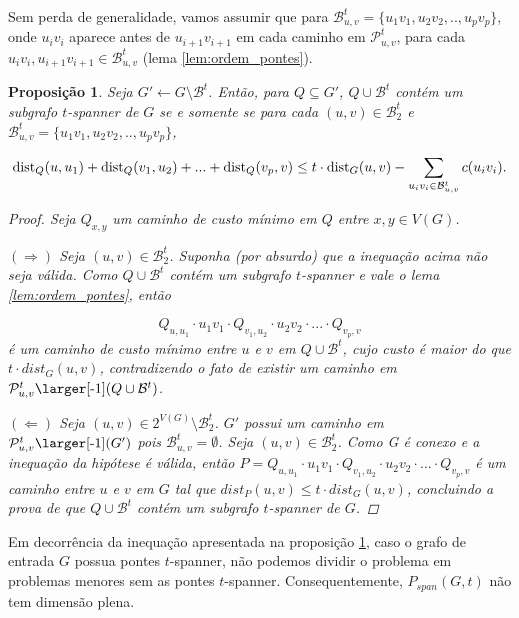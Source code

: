 \documentclass[11pt,reqno]{amsart}
\newcommand{\smallGprime}{\mbox{\larger[-1]$(G')$}}
\newcommand{\spanPath}{\mathcal{P}}
\newcommand{\spanBridge}{\mathcal{B}}
\newcommand{\Pathuv}{\spanPath_{u,v}^{t}}
\newcommand{\PathuvGprime}{\Pathuv\smallGprime}
\newcommand{\Bridgeuv}{\spanBridge_{u,v}^{t}}
\newcommand{\Bridge}{\spanBridge^{t}}
\newcommand{\smallQBridge}{\mbox{\larger[-1]$(Q \cup \Bridge)$}}
\newcommand{\PathuvQBridge}{\Pathuv\smallQBridge}
\newcommand{\BridgeTwo}{\spanBridge_{2}^{t}}
\newcommand{\dist}{{\rm dist}}
\newtheorem{proposicao}{Proposição}
\begin{document}
Sem perda de generalidade, vamos assumir que para 
$\Bridgeuv = \{u_1v_1, u_2v_2, .., u_pv_p\}$, 
onde $u_iv_i$ aparece antes de $u_{i+1}v_{i+1}$ em cada caminho em $\Pathuv$, 
para cada $u_iv_i,u_{i+1}v_{i+1} \in \Bridgeuv$ (lema \ref{lem:ordem_pontes}).
\begin{proposicao}
\label{prop:dimensao_nao_plena}
Seja $G' \leftarrow G \setminus \Bridge$. Então, 
para $Q \subseteq G'$, $Q \cup \Bridge$ contém um subgrafo $t$-spanner de $G$ 
se e somente se 
para cada $(u,v) \in \BridgeTwo$ 
e $\Bridgeuv = \{u_1v_1, u_2v_2, .., u_pv_p\}$, 

\begin{equation*}
\dist_{Q}(u,u_1) + \dist_{Q}(v_1,u_2) + ... + \dist_{Q}(v_p,v) \le t \cdot \dist_{G}(u,v) - \sum_{u_iv_i \in \Bridgeuv} c(u_iv_i).
\end{equation*}
\begin{proof}
Seja $Q_{x,y}$ um caminho de custo mínimo em $Q$ entre $x,y \in V(G)$. 

$(\Rightarrow)$ Seja $(u,v) \in \BridgeTwo$. 
Suponha (por absurdo) que a inequação acima 
não seja válida. 
Como $Q \cup \Bridge$ contém um subgrafo $t$-spanner 
e vale o lema \ref{lem:ordem_pontes}, então 

\begin{equation*} 
Q_{u,u_1} \cdot u_1v_1 \cdot Q_{v_1,u_2} \cdot u_2v_2 \cdot ... \cdot Q_{v_p,v}
\end{equation*}
é um caminho de custo mínimo entre $u$ e $v$ em $Q \cup \Bridge$, 
cujo custo é maior do que $t \cdot dist_{G}(u,v)$, contradizendo o fato de 
existir um caminho em $\PathuvQBridge$.

$(\Leftarrow)$
Seja $(u,v) \in 2^{V(G)} \setminus \BridgeTwo$. $G'$ possui um caminho em 
$\PathuvGprime$ pois $\Bridgeuv = \emptyset$. %
Seja $(u,v) \in \BridgeTwo$. 
Como G é conexo e a inequação da hipótese é válida, então 
$P = Q_{u,u_1} \cdot u_1v_1 \cdot Q_{v_1,u_2} \cdot u_2v_2 \cdot ... \cdot Q_{v_p,v}$ 
é um caminho entre $u$ e $v$ em $G$ tal que 
$dist_P(u,v) \le t \cdot dist_G(u,v)$, concluindo a prova de que 
$Q \cup \Bridge$ contém um subgrafo $t$-spanner de $G$.
\end{proof}
\end{proposicao}

Em decorrência da inequação apresentada na proposição 
\ref{prop:dimensao_nao_plena}, caso o grafo de entrada $G$ possua pontes 
$t$-spanner, não podemos dividir o problema em problemas menores sem as 
pontes $t$-spanner. Consequentemente, $P_{span}(G,t)$ não tem dimensão plena.
\end{document}
